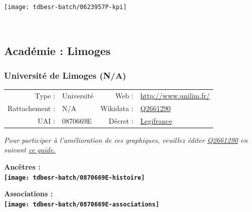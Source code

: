 \documentclass[12pt,french,]{article}
\begin{document}
\begin{center}\texttt{[image: tdbesr-batch/0623957P-kpi]} \end{center}\checkoddpage

\ifoddpage ~\newpage \fi   

\hypertarget{acaduxe9mie-limoges}{%
\subsection{Académie : Limoges}\label{acaduxe9mie-limoges}}

\hypertarget{universituxe9-de-limoges-na}{%
\subsubsection{Université de Limoges
(N/A)}\label{universituxe9-de-limoges-na}}

\begin{tabular*}{\textwidth}{rp{5cm}rl}  
\hline  
Type : & Université & Web : &\href{http://www.unilim.fr/}{http://www.unilim.fr/} \\  
Rattachement : & N/A & Wikidata : & \href{https://www.wikidata.org/entity/Q2661290}{Q2661290} \\  
UAI : & 0870669E & Décret : & \href{https://www.legifrance.gouv.fr/eli/decret/2016/12/15/MENS1630827D/jo/texte/fr}{Legifrance} \\  
\hline  
\end{tabular*}

\textit{\scriptsize Pour participer à l'amélioration de ces graphiques, veuillez éditer  \href{https://www.wikidata.org/entity/Q2661290}{Q2661290}  en suivant \href{https://github.com/cpesr/wikidataESR/blob/master/Rmd/wikidataESR.md}{ce guide.}}

\vspace{1cm}  
\begin{minipage}[b]{0.50\textwidth}\begin{center} \bf Ancêtres : \\  
\texttt{[image: tdbesr-batch/0870669E-histoire]} \end{center}\end{minipage}\begin{minipage}[b]{0.50\textwidth}\begin{center} \bf Associations : \\  
\texttt{[image: tdbesr-batch/0870669E-associations]} \end{center}\end{minipage}
\end{document}
